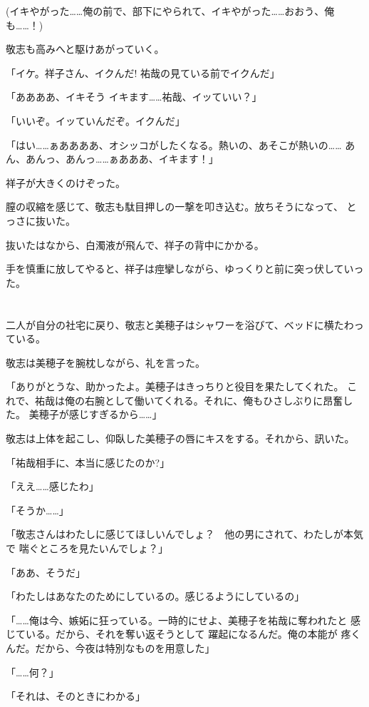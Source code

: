 ﻿\documentclass[
    book,tate,
    line_length=30zw,
    jafontsize=12pt,
    paper=b5j,
    landscape,
    ]{jlreq}
\begin{document}
(イキやがった……俺の前で、部下にやられて、イキやがった……おおう、俺も……！)

敬志も高みへと駆けあがっていく。

「イケ。祥子さん、イクんだ! 祐哉の見ている前でイクんだ」

「ああああ、イキそう イキます……祐哉、イッていい？」

「いいぞ。イッていんだぞ。イクんだ」

「はい……ぁああああ、オシッコがしたくなる。熱いの、あそこが熱いの……
あん、あんっ、あんっ……ぁあああ、イキます！」

祥子が大きくのけぞった。

膣の収縮を感じて、敬志も駄目押しの一撃を叩き込む。放ちそうになって、
とっさに抜いた。

抜いたはなから、白濁液が飛んで、祥子の背中にかかる。

手を慎重に放してやると、祥子は痙攣しながら、ゆっくりと前に突っ伏していった。

\section*{}

二人が自分の社宅に戻り、敬志と美穂子はシャワーを浴びて、ベッドに横たわっている。

敬志は美穂子を腕枕しながら、礼を言った。

「ありがとうな、助かったよ。美穂子はきっちりと役目を果たしてくれた。
これで、祐哉は俺の右腕として働いてくれる。それに、俺もひさしぶりに昂奮した。 
美穂子が感じすぎるから……」

敬志は上体を起こし、仰臥した美穂子の唇にキスをする。それから、訊いた。

「祐哉相手に、本当に感じたのか?」

「ええ……感じたわ」

「そうか……」

「敬志さんはわたしに感じてほしいんでしょ？　他の男にされて、わたしが本気で
喘ぐところを見たいんでしょ？」

「ああ、そうだ」

「わたしはあなたのためにしているの。感じるようにしているの」

「……俺は今、嫉妬に狂っている。一時的にせよ、美穂子を祐哉に奪われたと
感じている。だから、それを奪い返そうとして 躍起になるんだ。俺の本能が
疼くんだ。だから、今夜は特別なものを用意した」

「……何？」

「それは、そのときにわかる」
\end{document}
